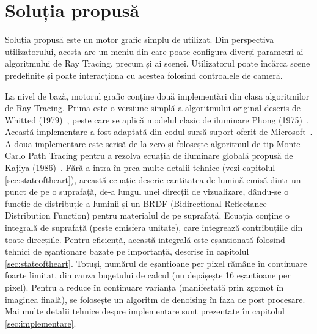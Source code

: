 \documentclass[12pt,a4paper]{report}
\numberwithin{equation}{section} %
\begin{document}
\subsubsection*{}

\section{Soluția propusă}
Soluția propusă este un motor grafic simplu de utilizat. Din perspectiva utilizatorului,
acesta are un meniu din care poate configura diverși parametri ai algoritmului
de Ray Tracing, precum și ai scenei. Utilizatorul poate încărca scene predefinite
și poate interacționa cu acestea folosind controalele de cameră.

La nivel de bază, motorul grafic conține două implementări din clasa algoritmilor
de Ray Tracing. Prima este o versiune simplă a algoritmului original descris de
Whitted (1979)~\cite{Whitted}, peste care se aplică modelul clasic de iluminare
Phong (1975)~\cite{Phong}. Această implementare a fost adaptată din codul sursă
suport oferit de Microsoft~\cite{Schelet}.
A doua implementare este scrisă de la zero și folosește algoritmul de tip Monte Carlo
Path Tracing pentru a rezolva ecuația de iluminare globală propusă de Kajiya (1986)~\cite{Kajiya}.
Fără a intra în prea multe detalii tehnice (vezi capitolul \ref{sec:stateoftheart}),
această ecuație descrie cantitatea de lumină emisă dintr-un punct de pe o suprafață,
de-a lungul unei direcții de vizualizare, dându-se o funcție de distribuție a luminii
și un BRDF (Bidirectional Reflectance Distribution Function) pentru materialul de pe
suprafață. Ecuația conține o integrală de suprafață (peste emisfera unitate), care
integrează contribuțiile din toate direcțiile. Pentru eficiență, această integrală
este eșantionată folosind tehnici de eșantionare bazate pe importanță, descrise în capitolul \ref{sec:stateoftheart}.
Totuși, numărul de eșantioane per pixel rămâne în continuare foarte limitat, din
cauza bugetului de calcul (nu depășește 16 eșantioane per pixel). Pentru a reduce
în continuare varianța (manifestată prin zgomot în imaginea finală), se folosește
un algoritm de denoising în faza de post procesare. Mai multe detalii tehnice
despre implementare sunt prezentate în capitolul \ref{sec:implementare}.
\end{document}
